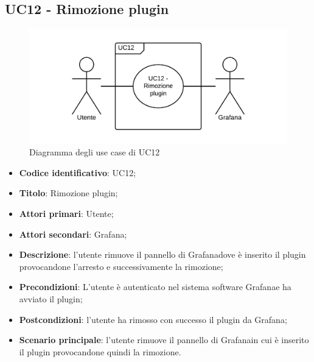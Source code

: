 \subsection{UC12 - Rimozione plugin}
\begin{figure}[H]
\includegraphics{img/UC12_-_Rimozione_plugin.png}
\caption{Diagramma degli use case di UC12}
\end{figure}
\begin{itemize}
    \item \textbf{Codice identificativo}: UC12;
    \item \textbf{Titolo}: Rimozione plugin;
    \item \textbf{Attori primari}: Utente;
    \item \textbf{Attori secondari}: Grafana\glo;
    \item \textbf{Descrizione}: l'utente rimuove il pannello di Grafana\glosp dove è inserito il plugin provocandone l'arresto e successivamente la rimozione;
    \item \textbf{Precondizioni}: L'utente è autenticato nel sistema software Grafana\glosp e ha avviato il plugin;
    \item \textbf{Postcondizioni}: l'utente ha rimosso con successo il plugin da Grafana\glo;
    \item \textbf{Scenario principale}: l'utente rimuove il pannello di Grafana\glosp in cui è inserito il plugin provocandone quindi la rimozione.
\end{itemize}